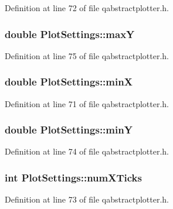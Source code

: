 Definition at line 72 of file qabstractplotter.\+h.

\hypertarget{class_plot_settings_a79c0bea58aa61bffe86d2b282d1ce7dd}{}
\subsubsection[{max\+Y}]{\setlength{\rightskip}{0pt plus 5cm}double Plot\+Settings\+::max\+Y}\label{class_plot_settings_a79c0bea58aa61bffe86d2b282d1ce7dd}


Definition at line 75 of file qabstractplotter.\+h.

\hypertarget{class_plot_settings_a0f3c3bfbc9387ca63259b8316488530e}{}
\subsubsection[{min\+X}]{\setlength{\rightskip}{0pt plus 5cm}double Plot\+Settings\+::min\+X}\label{class_plot_settings_a0f3c3bfbc9387ca63259b8316488530e}


Definition at line 71 of file qabstractplotter.\+h.

\hypertarget{class_plot_settings_ad3cc5104ce9c973747a166f940f73962}{}
\subsubsection[{min\+Y}]{\setlength{\rightskip}{0pt plus 5cm}double Plot\+Settings\+::min\+Y}\label{class_plot_settings_ad3cc5104ce9c973747a166f940f73962}


Definition at line 74 of file qabstractplotter.\+h.

\hypertarget{class_plot_settings_a6cb8aae67d8e1fc60ccb61f50b37bf0c}{}
\subsubsection[{num\+X\+Ticks}]{\setlength{\rightskip}{0pt plus 5cm}int Plot\+Settings\+::num\+X\+Ticks}\label{class_plot_settings_a6cb8aae67d8e1fc60ccb61f50b37bf0c}


Definition at line 73 of file qabstractplotter.\+h.

